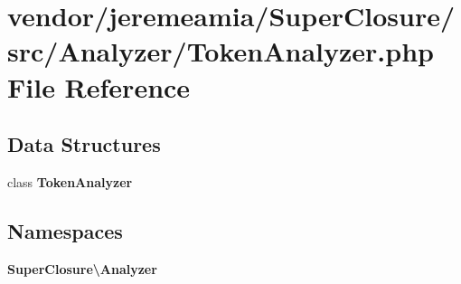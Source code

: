 \section{vendor/jeremeamia/\+Super\+Closure/src/\+Analyzer/\+Token\+Analyzer.php File Reference}
\label{_token_analyzer_8php}
\subsection*{Data Structures}
\begin{DoxyCompactItemize}
\item 
class {\bf Token\+Analyzer}
\end{DoxyCompactItemize}
\subsection*{Namespaces}
\begin{DoxyCompactItemize}
\item 
 {\bf Super\+Closure\textbackslash{}\+Analyzer}
\end{DoxyCompactItemize}
